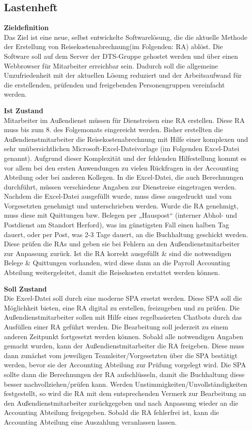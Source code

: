 \subsection{Lastenheft}
\label{sec:Anhang:Lastenheft}
\textbf{Zieldefinition}\\
Das Ziel ist eine neue, selbst entwickelte Softwarelösung, die die aktuelle Methode der Erstellung von Reisekostenabrechnung(im Folgenden: RA) ablöst. Die Software soll auf dem Server der DTS-Gruppe gehostet werden und über einen Webbrowser für Mitarbeiter erreichbar sein. Dadurch soll die allgemeine Unzufriedenheit mit der aktuellen Lösung reduziert und der Arbeitsaufwand für die erstellenden, prüfenden und freigebenden Personengruppen vereinfacht werden.

\textbf{Ist Zustand}\\
Mitarbeiter im Außendienst müssen für Dienstreisen eine RA erstellen. Diese RA muss bis zum 8. des Folgemonats eingereicht werden. Bisher erstellten die Außendienstmitarbeiter die Reisekostenabrechnung mit Hilfe einer komplexen und sehr unübersichtlichen Microsoft-Excel-Dateivorlage (im Folgenden Excel-Datei genannt). Aufgrund dieser Komplexität und der fehlenden Hilfestellung kommt es vor allem bei den ersten Anwendungen zu vielen Rückfragen in der Accounting Abteilung oder bei anderen Kollegen. In die Excel-Datei, die auch Berechnungen durchführt, müssen verschiedene Angaben zur Dienstreise eingetragen werden. Nachdem die Excel-Datei ausgefüllt wurde, muss diese ausgedruckt und vom Vorgesetzten genehmigt und unterschrieben werden. Wurde die RA genehmigt, muss diese mit Quittungen bzw. Belegen per „Hauspost“ (interner Abhol- und Postdienst am Standort Herford), was im günstigsten Fall einen halben Tag dauert, oder per Post, was 2-3 Tage dauert, an die Buchhaltung geschickt werden.
Diese prüfen die RAs und geben sie bei Fehlern an den Außendienstmitarbeiter zur Anpassung zurück. Ist die RA korrekt ausgefüllt \& sind die notwendigen Belege \& Quittungen vorhanden, wird diese dann an die Payroll Accounting Abteilung weitergeleitet, damit die Reisekosten erstattet werden können.

\textbf{Soll Zustand}\\
Die Excel-Datei soll durch eine moderne SPA ersetzt werden. Diese SPA soll die Möglichkeit bieten, eine RA digital zu erstellen, freizugeben und zu prüfen. Die Außendienstmitarbeiter sollen mit Hilfe eines regelbasierten Chatbots durch das Ausfüllen einer RA geführt werden. Die Bearbeitung soll jederzeit zu einem anderen Zeitpunkt fortgesetzt werden können. Sobald alle notwendigen Angaben gemacht wurden, kann der Außendienstmitarbeiter die RA freigeben. Diese muss dann zunächst vom jeweiligen Teamleiter/Vorgesetzten über die SPA bestätigt werden, bevor sie der Accounting Abteilung zur Prüfung vorgelegt wird. Die SPA sollte dann die Berechnungen der RA aufschlüsseln, damit die Buchhaltung diese besser nachvollziehen/prüfen kann. Werden Unstimmigkeiten/Unvollständigkeiten festgestellt, so wird die RA mit dem entsprechenden Vermerk zur Bearbeitung an den Außendienstmitarbeiter zurückgegeben und nach Anpassung wieder an die Accounting Abteilung freigegeben. Sobald die RA fehlerfrei ist, kann die Accounting Abteilung eine Auszahlung veranlassen lassen.

